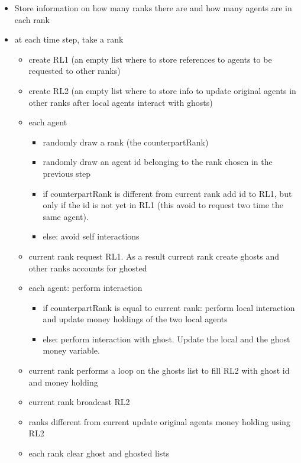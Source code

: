 \documentclass{article}
\providecommand{\tightlist}{%
  \setlength{\itemsep}{0pt}\setlength{\parskip}{0pt}}
\begin{document}
\begin{itemize}
\tightlist
\item
  Store information on how many ranks there are and how many agents are
  in each rank
\item
	at each time step, take a rank

  \begin{itemize}
  \tightlist
  \item
    create RL1 (an empty list where to store references to agents to be requested to
    other ranks)
  \item
    create RL2 (an empty list where to store info to update original agents in other ranks after local agents interact with ghosts)
  \item
    each agent

    \begin{itemize}
    \tightlist
    \item
	    randomly draw a rank (the counterpartRank)
    \item
      randomly draw an agent id belonging to the rank chosen in the
      previous step
    \item
      if counterpartRank is different from current rank add id to RL1, but only if
      the id is not yet in RL1 (this avoid to request two time the same agent). 
    \item else: avoid self interactions
    \end{itemize}
  \item
    current rank request RL1. As a result current rank create ghosts and
    other ranks accounts for ghosted
  \item
	  each agent: perform interaction
	  \begin{itemize}
		  \item if counterpartRank is equal to current rank: perform local interaction and update money holdings of the two local agents
		  \item else: perform interaction with ghost. Update the local and the ghost money variable.
	  \end{itemize}
	\item current rank performs a loop on the ghosts list to fill RL2 with ghost id and money holding
	\item current rank broadcast RL2 
	\item ranks different from current update original agents money holding using RL2
	\item each rank clear ghost and ghosted lists

  \end{itemize}
\end{itemize}
\end{document}
